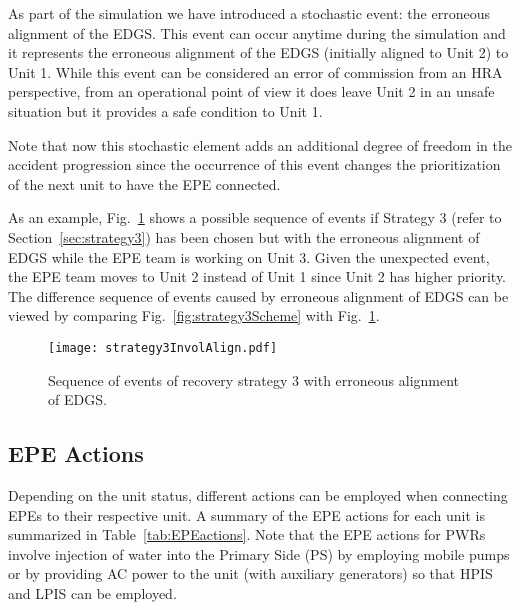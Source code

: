 As part of the simulation we have introduced a stochastic event: the erroneous alignment of the EDGS.
This event can occur anytime during the simulation and it represents the erroneous alignment of the EDGS 
(initially aligned to Unit 2) to Unit 1. 
While this event can be considered an error of commission from an HRA perspective, from an operational point of view 
it does leave Unit 2 in an unsafe situation but it provides a safe condition to Unit 1. 

Note that now this stochastic element adds an additional degree of freedom in the accident progression since the 
occurrence of this event changes the prioritization of the next unit to have the EPE connected.

As an example, Fig.~\ref{fig:strategy3SchemeInvolAlign} shows a possible sequence of events if Strategy 3 
(refer to Section~\ref{sec:strategy3}) has been chosen but with the erroneous alignment of EDGS while the EPE team
is working on Unit 3. Given the unexpected event, the EPE team moves to Unit 2 instead of Unit 1 since Unit 2
has higher priority. The difference sequence of events caused by erroneous alignment of EDGS can be viewed
by comparing Fig.~\ref{fig:strategy3Scheme} with Fig.~\ref{fig:strategy3SchemeInvolAlign}.

\begin{figure}
  \centering
  \centerline{\texttt{[image: strategy3InvolAlign.pdf]}}
  \caption{Sequence of events of recovery strategy 3 with erroneous alignment of EDGS.}
  \label{fig:strategy3SchemeInvolAlign}
\end{figure}

\subsection{EPE Actions}
\label{sec:EPEactions}

Depending on the unit status, different actions can be employed when connecting EPEs to their respective unit.
A summary of the EPE actions for each unit is summarized in Table~\ref{tab:EPEactions}. 
Note that the EPE actions for PWRs involve injection of water into the Primary Side (PS) by employing mobile pumps or by providing AC power to the unit (with auxiliary generators) so that HPIS and LPIS can be employed.

